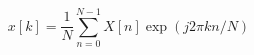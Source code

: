 \documentclass{jsarticle}
\begin{document}
\begin{equation*}
    x\left[k\right] = \frac{1}{N}\sum_{n=0}^{N-1}X\left[n\right]\exp\left(j 2\pi kn/N\right)
\end{equation*}
\end{document}
